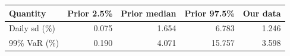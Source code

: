 \begin{tabular}{lrrrr}
\toprule
Quantity & Prior 2.5\% & Prior median & Prior 97.5\% & Our data \\
\midrule
Daily sd (\%) & 0.075 & 1.654 & 6.783 & 1.246 \\
99\% VaR (\%) & 0.190 & 4.071 & 15.757 & 3.598 \\
\bottomrule
\end{tabular}
